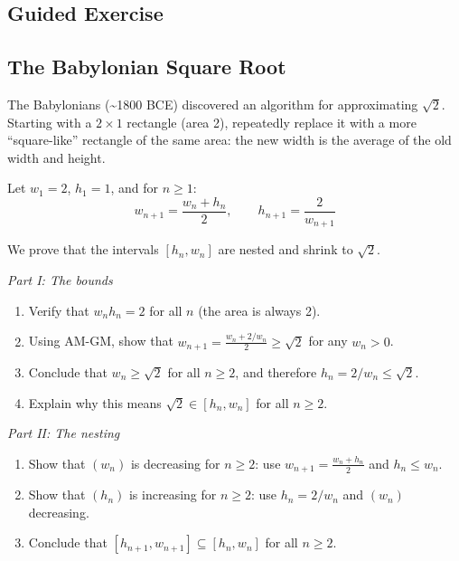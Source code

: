 \documentclass[
  10pt,
  letterpaper,
]{scrbook}
\begin{document}
\subsection{Guided Exercise}\label{guided-exercise-1}

\subsection{The Babylonian Square
Root}\label{the-babylonian-square-root}

The Babylonians (\textasciitilde1800 BCE) discovered an algorithm for
approximating \(\sqrt{2}\). Starting with a \(2 \times 1\) rectangle
(area 2), repeatedly replace it with a more ``square-like'' rectangle of
the same area: the new width is the average of the old width and height.

Let \(w_1 = 2\), \(h_1 = 1\), and for \(n \geq 1\):
\[w_{n+1} = \frac{w_n + h_n}{2}, \qquad h_{n+1} = \frac{2}{w_{n+1}}\]

We prove that the intervals \([h_n, w_n]\) are nested and shrink to
\(\sqrt{2}\).

\emph{Part I: The bounds}

\begin{enumerate}
\def\labelenumi{(\alph{enumi})}
\item
  Verify that \(w_n h_n = 2\) for all \(n\) (the area is always 2).
\item
  Using AM-GM, show that
  \(w_{n+1} = \frac{w_n + 2/w_n}{2} \geq \sqrt{2}\) for any \(w_n > 0\).
\item
  Conclude that \(w_n \geq \sqrt{2}\) for all \(n \geq 2\), and
  therefore \(h_n = 2/w_n \leq \sqrt{2}\).
\item
  Explain why this means \(\sqrt{2} \in [h_n, w_n]\) for all
  \(n \geq 2\).
\end{enumerate}

\emph{Part II: The nesting}

\begin{enumerate}
\def\labelenumi{(\alph{enumi})}
\setcounter{enumi}{4}
\item
  Show that \((w_n)\) is decreasing for \(n \geq 2\): use
  \(w_{n+1} = \frac{w_n + h_n}{2}\) and \(h_n \leq w_n\).
\item
  Show that \((h_n)\) is increasing for \(n \geq 2\): use
  \(h_n = 2/w_n\) and \((w_n)\) decreasing.
\item
  Conclude that \([h_{n+1}, w_{n+1}] \subseteq [h_n, w_n]\) for all
  \(n \geq 2\).
\end{enumerate}
\end{document}
